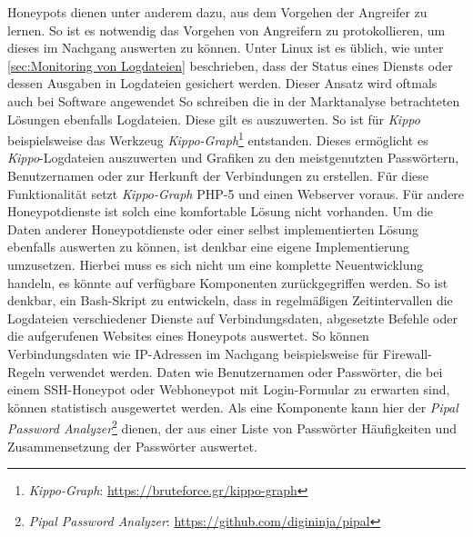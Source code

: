 Honeypots dienen unter anderem dazu, aus dem Vorgehen der Angreifer zu lernen. So ist es notwendig das Vorgehen von Angreifern zu protokollieren, um dieses im Nachgang auswerten zu können. Unter Linux ist es üblich, wie unter \ref{sec:Monitoring von Logdateien} beschrieben, dass der Status eines Diensts oder dessen Ausgaben in Logdateien gesichert werden. Dieser Ansatz wird oftmals auch bei Software angewendet So schreiben die in der Marktanalyse betrachteten Lösungen ebenfalls Logdateien. Diese gilt es auszuwerten. So ist für \textit{Kippo} beispielsweise das Werkzeug \textit{Kippo-Graph}\footnote{ \textit{Kippo-Graph}: \url{https://bruteforce.gr/kippo-graph}} entstanden. Dieses ermöglicht es \textit{Kippo}-Logdateien auszuwerten und Grafiken zu den meistgenutzten Passwörtern, Benutzernamen oder zur Herkunft der Verbindungen zu erstellen. Für diese Funktionalität setzt \textit{Kippo-Graph} PHP-5 und einen Webserver voraus. Für andere Honeypotdienste ist solch eine komfortable Lösung nicht vorhanden. Um die Daten anderer Honeypotdienste oder einer selbst implementierten Lösung ebenfalls auswerten zu können, ist denkbar eine eigene Implementierung umzusetzen. Hierbei muss es sich nicht um eine komplette Neuentwicklung handeln, es könnte auf verfügbare Komponenten zurückgegriffen werden. So ist denkbar, ein Bash-Skript zu entwickeln, dass in regelmäßigen Zeitintervallen die Logdateien verschiedener Dienste auf Verbindungsdaten, abgesetzte Befehle oder die aufgerufenen Websites eines Honeypots auswertet. So können Verbindungsdaten wie IP-Adressen im Nachgang beispielsweise für Firewall-Regeln verwendet werden. Daten wie Benutzernamen oder Passwörter, die bei einem SSH-Honeypot oder Webhoneypot mit Login-Formular zu erwarten sind, können statistisch ausgewertet werden. Als eine Komponente kann hier der \textit{Pipal Password Analyzer}\footnote{ \textit{Pipal Password Analyzer}: \url{https://github.com/digininja/pipal}} dienen, der aus einer Liste von Passwörter Häufigkeiten und Zusammensetzung der Passwörter auswertet.
